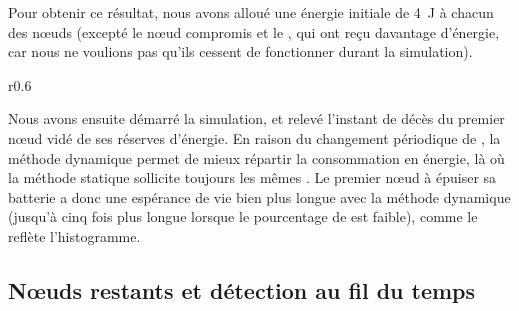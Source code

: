 Pour obtenir ce résultat, nous avons alloué une énergie initiale de 4~J à chacun des nœuds (excepté le nœud compromis et le \ch, qui ont reçu davantage d'énergie, car nous ne voulions pas qu'ils cessent de fonctionner durant la simulation).
\begin{wrapfigure}{r}{0.6\linewidth} %
    \vspace{-1pt}
    \newlength{\fboxlinelenb}
    \setlength{\fboxlinelenb}{\linewidth}
    \addtolength{\fboxlinelenb}{-2\fboxsep}
    \addtolength{\fboxlinelenb}{-2\fboxrule}
    \vspace{-1pt}
\end{wrapfigure}
Nous avons ensuite démarré la simulation, et relevé l'instant de décès du premier nœud vidé de ses réserves d'énergie.
En raison du changement périodique de \cns, la méthode dynamique permet de mieux répartir la consommation en énergie, là où la méthode statique sollicite toujours les mêmes \cns.
Le premier nœud à épuiser sa batterie a donc une espérance de vie bien plus longue avec la méthode dynamique (jusqu'à cinq fois plus longue lorsque le pourcentage de \cns est faible), comme le reflète l'histogramme.

    \subsection{Nœuds restants et détection au fil du temps}

